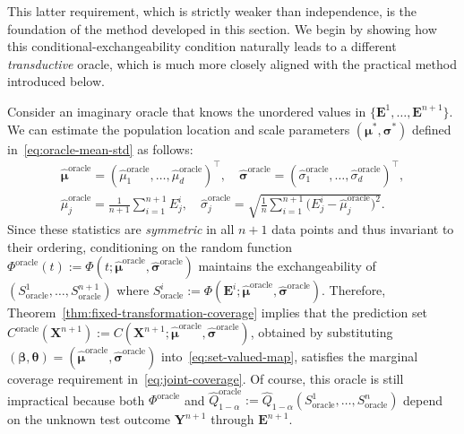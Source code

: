 This latter requirement, which is strictly weaker than independence, is the foundation of the method developed in this section.
We begin by showing how this conditional-exchangeability condition naturally leads to a different \emph{transductive} oracle, which is much more closely aligned with the practical method introduced below.

Consider an imaginary oracle that knows the unordered values in $\{\mathbf{E}^1,\ldots,\mathbf{E}^{n+1}\}$. We can estimate the population location and scale parameters $(\boldsymbol \mu^*, \boldsymbol\sigma^*)$ defined in~\eqref{eq:oracle-mean-std} as follows:
\begin{equation} \label{eq:transductive-oracle-mean-std}
\begin{aligned}
\boldsymbol{\hat{\mu}}^{\mathrm{oracle}} = (\hat{\mu}^{\mathrm{oracle}}_1,\ldots,\hat{\mu}^{\mathrm{oracle}}_d)^\top,
\quad
\boldsymbol{\hat{\sigma}}^{\mathrm{oracle}} = (\hat{\sigma}^{\mathrm{oracle}}_1,\ldots,\hat{\sigma}^{\mathrm{oracle}}_d)^\top,\\
\hat{\mu}^{\mathrm{oracle}}_j  = \frac{1}{n+1} \sum_{i=1}^{n+1} {E}^i_j,
\quad
\hat{\sigma}^{\mathrm{oracle}}_j 
= \sqrt{\frac{1}{n} \sum_{i=1}^{n+1} \!\bigl({E}^i_j - \hat{\mu}^{\mathrm{oracle}}_j\bigr)^2}.
\end{aligned}
\end{equation}
Since these statistics are \emph{symmetric} in all $n+1$ data points and thus invariant to their ordering, conditioning on the random function $\Phi^\mathrm{oracle}(t):=\Phi(t; \boldsymbol{\hat{\mu}}^{\mathrm{oracle}}, \boldsymbol{\hat{\sigma}}^{\mathrm{oracle}} )$ maintains the exchangeability of $(S^1_{\mathrm{oracle}},\ldots,S^{n+1}_{\mathrm{oracle}})$ where $S^i_{\mathrm{oracle}}:= \Phi(\mathbf{E}^i; \boldsymbol{\hat{\mu}}^{\mathrm{oracle}}, \boldsymbol{\hat{\sigma}}^{\mathrm{oracle}})$. Therefore, Theorem~\ref{thm:fixed-transformation-coverage} implies that the prediction set ${C}^{\mathrm{oracle}}(\mathbf{X}^{n+1}):= C(\mathbf{X}^{n+1};\hat{\boldsymbol\mu}^{\mathrm{oracle}}, \hat{\boldsymbol\sigma}^{\mathrm{oracle}})$, obtained by substituting $(\boldsymbol \beta, \boldsymbol \theta) = (\hat{\boldsymbol\mu}^{\mathrm{oracle}}, \hat{\boldsymbol\sigma}^{\mathrm{oracle}})$ into~\eqref{eq:set-valued-map}, satisfies the marginal coverage requirement in~\eqref{eq:joint-coverage}.
Of course, this oracle is still impractical because both $\Phi^\mathrm{oracle}$ and $\hat{Q}^{\mathrm{oracle}}_{1-\alpha}:= \hat{Q}_{1-\alpha}(S^1_{\mathrm{oracle}},\ldots,S^n_{\mathrm{oracle}})$ depend on the unknown test outcome $\mathbf{Y}^{n+1}$ through $\mathbf{E}^{n+1}$. 

